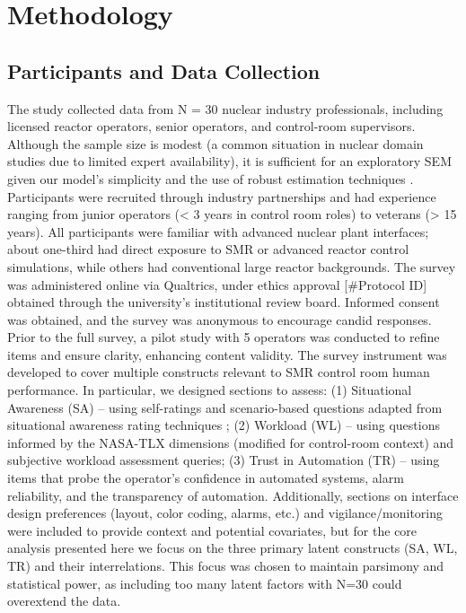 \documentclass[conference]{IEEEtran}
\begin{document}
\section{Methodology}

\subsection{Participants and Data Collection}
The study collected data from N = 30 nuclear industry professionals, including licensed reactor operators, senior operators, and control-room supervisors. Although the sample size is modest (a common situation in nuclear domain studies due to limited expert availability), it is sufficient for an exploratory SEM given our model’s simplicity and the use of robust estimation techniques \cite{taylor1999cutoff}. Participants were recruited through industry partnerships and had experience ranging from junior operators (< 3 years in control room roles) to veterans (> 15 years). All participants were familiar with advanced nuclear plant interfaces; about one-third had direct exposure to SMR or advanced reactor control simulations, while others had conventional large reactor backgrounds. The survey was administered online via Qualtrics, under ethics approval [#Protocol ID] obtained through the university’s institutional review board. Informed consent was obtained, and the survey was anonymous to encourage candid responses. Prior to the full survey, a pilot study with 5 operators was conducted to refine items and ensure clarity, enhancing content validity. The survey instrument was developed to cover multiple constructs relevant to SMR control room human performance. In particular, we designed sections to assess: (1) Situational Awareness (SA) – using self-ratings and scenario-based questions adapted from situational awareness rating techniques \cite{sage1995toward}; (2) Workload (WL) – using questions informed by the NASA-TLX dimensions (modified for control-room context) and subjective workload assessment queries; (3) Trust in Automation (TR) – using items that probe the operator’s confidence in automated systems, alarm reliability, and the transparency of automation. Additionally, sections on interface design preferences (layout, color coding, alarms, etc.) and vigilance/monitoring were included to provide context and potential covariates, but for the core analysis presented here we focus on the three primary latent constructs (SA, WL, TR) and their interrelations. This focus was chosen to maintain parsimony and statistical power, as including too many latent factors with N=30 could overextend the data.
\end{document}
